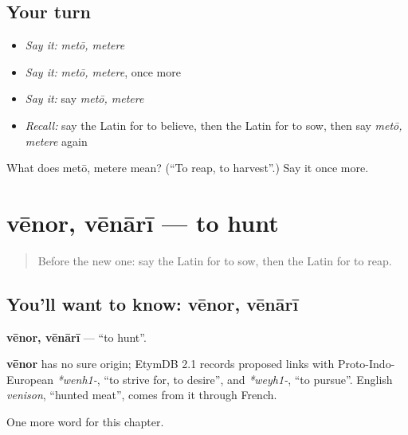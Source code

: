 \subsection*{Your turn}
\begin{itemize}
\raggedright
  \item \emph{Say it:} \emph{metō, metere}
  \item \emph{Say it:} \emph{metō, metere}, once more
  \item \emph{Say it:} say \emph{metō, metere}
  \item \emph{Recall:} say the Latin for to believe, then the Latin for to sow, then say \emph{metō, metere} again
\end{itemize}

\begin{tcolorbox}[breakable,colback=teal!4,colframe=teal!35!black,title={Before you move on}]
What does metō, metere mean? (\textquotedblleft{}To reap, to harvest\textquotedblright{}.) Say it once more.
\end{tcolorbox}
\section[vēnor, vēnārī]{vēnor, vēnārī — to hunt}

\label{lesson:LA-C172-venor}



\begin{quote}
Before the new one: say the Latin for to sow, then the Latin for to reap.
\end{quote}

\subsection*{You'll want to know: vēnor, vēnārī}
\textbf{vēnor, vēnārī} — \textquotedblleft{}to hunt\textquotedblright{}.

\begin{cousinweb}
\textbf{vēnor} has no sure origin; EtymDB 2.1 records proposed links with Proto-Indo-European \emph{*wenh1-}, \textquotedblleft{}to strive for, to desire\textquotedblright{}, and \emph{*weyh1-}, \textquotedblleft{}to pursue\textquotedblright{}. English \emph{venison}, \textquotedblleft{}hunted meat\textquotedblright{}, comes from it through French.
\end{cousinweb}

\begin{grammarlens}[title={What you've built}]
One more word for this chapter.
\end{grammarlens}

